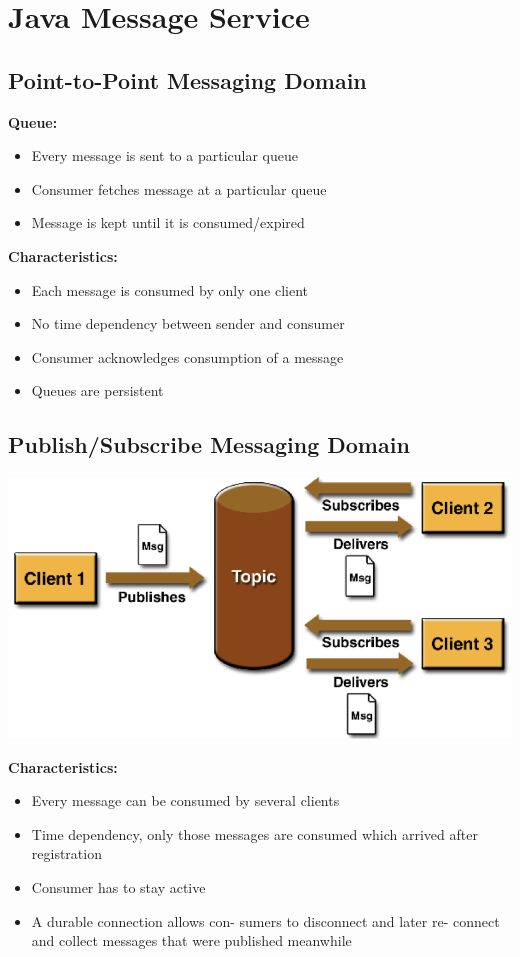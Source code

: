 \documentclass[10pt]{article}
\begin{document}
\newpage
\section{Java Message Service}
\subsection{Point-to-Point Messaging Domain}
\textbf{Queue:}
\begin{itemize}
	\item Every message is sent to a particular queue
	\item Consumer fetches message at a particular queue
	\item Message is kept until it is consumed/expired
\end{itemize}
\textbf{Characteristics:}
\begin{itemize}
	\item Each message is consumed by only one client
	\item No time dependency between sender and consumer
	\item Consumer acknowledges consumption of a message
	\item Queues are persistent
\end{itemize}
\subsection{Publish/Subscribe Messaging Domain}
\begin{center}
	\includegraphics[scale=0.25]{jms-messaging-domain.png}
\end{center}
\textbf{Characteristics:}
\begin{itemize}
	\item Every message can be consumed by several clients
	\item Time dependency, only those messages are consumed which arrived after registration
	\item Consumer has to stay active
	\item A durable connection allows con- sumers to disconnect and later re- connect and collect messages that were published meanwhile
\end{itemize}
\end{document}

